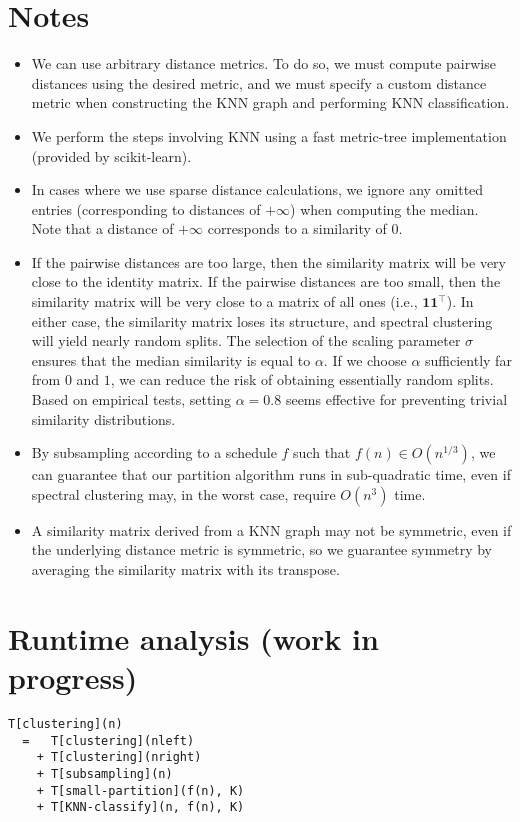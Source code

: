 \documentclass[11pt]{article}
\begin{document}
\section*{Notes}

\begin{itemize}
\item We can use arbitrary distance metrics.
To do so, we must compute pairwise distances using the desired metric, and we must specify a custom distance metric when constructing the KNN graph and performing KNN classification.
%
\item We perform the steps involving KNN using a fast metric-tree implementation (provided by scikit-learn).
%
\item In cases where we use sparse distance calculations, we ignore any omitted entries (corresponding to distances of $+\infty$) when computing the median.
Note that a distance of $+\infty$ corresponds to a similarity of $0$.
%
\item If the pairwise distances are too large, then the similarity matrix will be very close to the identity matrix.
If the pairwise distances are too small, then the similarity matrix will be very close to a matrix of all ones (i.e., $\mathbf{1}\mathbf{1}^\top$).
In either case, the similarity matrix loses its structure, and spectral clustering will yield nearly random splits.
The selection of the scaling parameter $\sigma$ ensures that the median similarity is equal to $\alpha$.
If we choose $\alpha$ sufficiently far from $0$ and $1$, we can reduce the risk of obtaining essentially random splits.
Based on empirical tests, setting $\alpha = 0.8$ seems effective for preventing trivial similarity distributions.
%
\item By subsampling according to a schedule $f$ such that $f(n) \in O(n^{1/3})$, we can guarantee that our partition algorithm runs in sub-quadratic time, even if spectral clustering may, in the worst case, require $O(n^3)$ time.
%
\item A similarity matrix derived from a KNN graph may not be symmetric, even if the underlying distance metric is symmetric, so we guarantee symmetry by averaging the similarity matrix with its transpose.
\end{itemize}

\section*{Runtime analysis (work in progress)}

\lstset{basicstyle=\footnotesize\ttfamily,breaklines=true}
\begin{lstlisting}
T[clustering](n)
  =   T[clustering](nleft)
    + T[clustering](nright)
    + T[subsampling](n)
    + T[small-partition](f(n), K)
    + T[KNN-classify](n, f(n), K)
\end{lstlisting}
\end{document}
